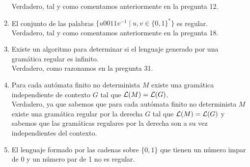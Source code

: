 \begin{enumerate}
        Verdadero, tal y como comentamos anteriormente en la pregunta 12.
    \item El conjunto de las palabras $\{u0011v^{-1}\mid u,v\in {\{0,1\}}^{\ast}\}$ es regular.\\

        Verdadero, tal y como comentamos anteriormente en la pregunta 18.
    \item Existe un algoritmo para determinar si el lenguaje generado por una gramática regular es infinito.\\

        Verdadero, como razonamos en la pregunta 31.
    \item Para cada autómata finito no determinista $M$ existe una gramática independiente de contexto $G$ tal que $\mathcal{L}(M) = \mathcal{L}(G)$.\\

        Verdadero, ya que sabemos que para cada autómata finito no determinista $M$ existe una gramática regular por la derecha $G$ tal que $\mathcal{L}(M) = \mathcal{L}(G)$ y sabemos que las gramáticas regulares por la derecha son a su vez independientes del contexto.
    \item El lenguaje formado por las cadenas sobre $\{0,1\}$ que tienen un número impar de 0 y un número par de 1 no es regular.\\


\end{enumerate}
